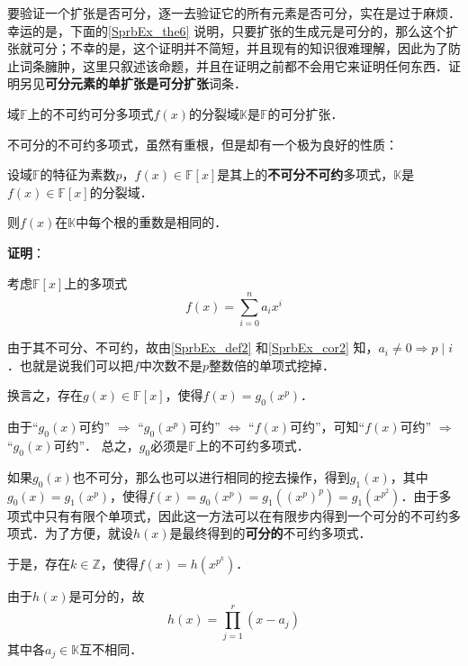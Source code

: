 要验证一个扩张是否可分，逐一去验证它的所有元素是否可分，实在是过于麻烦．幸运的是，下面的\autoref{SprbEx_the6} 说明，只要扩张的生成元是可分的，那么这个扩张就可分；不幸的是，这个证明并不简短，并且现有的知识很难理解，因此为了防止词条臃肿，这里只叙述该命题，并且在证明之前都不会用它来证明任何东西．证明另见\textbf{可分元素的单扩张是可分扩张}词条．

\begin{theorem}{}\label{SprbEx_the6}
域$\mathbb{F}$上的不可约可分多项式$f(x)$的分裂域$\mathbb{K}$是$\mathbb{F}$的可分扩张．
\end{theorem}



不可分的不可约多项式，虽然有重根，但是却有一个极为良好的性质：


\begin{theorem}{}\label{SprbEx_the3}
设域$\mathbb{F}$的特征为素数$p$，$f(x)\in\mathbb{F}[x]$是其上的\textbf{不可分不可约}多项式，$\mathbb{K}$是$f(x)\in\mathbb{F}[x]$的分裂域．

则$f(x)$在$\mathbb{K}$中每个根的重数是相同的．
\end{theorem}

\textbf{证明}：

考虑$\mathbb{F}[x]$上的多项式
\begin{equation}
f(x) = \sum_{i=0}^n a_ix^i
\end{equation}


由于其不可分、不可约，故由\autoref{SprbEx_def2} 和\autoref{SprbEx_cor2} 知，$a_i\neq 0 \Rightarrow p\mid i$．也就是说我们可以把$f$中次数不是$p$整数倍的单项式挖掉．

换言之，存在$g(x)\in\mathbb{F}[x]$，使得$f(x)=g_0(x^p)$．

由于“$g_0(x)$可约” $\Rightarrow$ “$g_0(x^p)$可约” $\iff$ “$f(x)$可约”，可知“$f(x)$可约” $\Rightarrow$ “$g_0(x)$可约”． 总之，$g_0$必须是$\mathbb{F}$上的不可约多项式．

如果$g_0(x)$也不可分，那么也可以进行相同的挖去操作，得到$g_1(x)$，其中$g_0(x) = g_1(x^p)$，使得$f(x) = g_0(x^p) = g_1((x^p)^p) = g_1(x^{p^2})$．由于多项式中只有有限个单项式，因此这一方法可以在有限步内得到一个可分的不可约多项式．为了方便，就设$h(x)$是最终得到的\textbf{可分的}不可约多项式．

于是，存在$k\in\mathbb{Z}$，使得$f(x) = h(x^{p^k})$．

由于$h(x)$是可分的，故
\begin{equation}
h(x) = \prod_{j=1}^{r}(x-a_j)
\end{equation}
其中各$a_j\in\mathbb{K}$互不相同．

